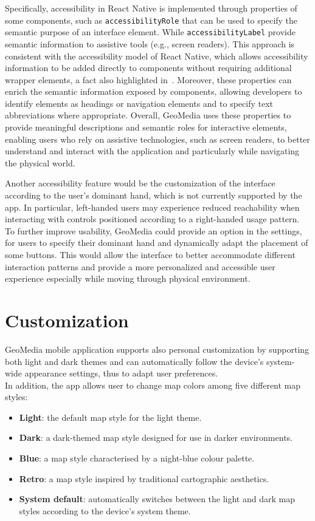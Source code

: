 Specifically, accessibility in React Native is implemented through properties of some components, such as \texttt{accessibilityRole} that can be used to specify the semantic purpose of an interface element. While \texttt{accessibilityLabel} provide semantic information to assistive tools (e.g., screen readers). This approach is consistent with the accessibility model of React Native, which allows accessibility information to be added directly to components without requiring additional wrapper elements, a fact also highlighted in~\cite{article:perinello2024}. Moreover, these properties can enrich the semantic information exposed by components, allowing developers to identify elements as headings or navigation elements and to specify text abbreviations where appropriate. Overall, GeoMedia uses these properties to provide meaningful descriptions and semantic roles for interactive elements, enabling users who rely on assistive technologies, such as screen readers, to better understand and interact with the application and particularly while navigating the physical world.


Another accessibility feature would be the customization of the interface according to the user's dominant hand, which is not currently supported by the app. In particular, left-handed users may experience reduced reachability when interacting with controls positioned according to a right-handed usage pattern. To further improve usability, GeoMedia could provide an option in the settings, for users to specify their dominant hand and dynamically adapt the placement of some buttons. This would allow the interface to better accommodate different interaction patterns and provide a more personalized and accessible user experience especially while moving through physical environment.

\section{Customization}

GeoMedia mobile application supports also personal customization by supporting both light and dark themes and can automatically follow the device's system-wide appearance settings, thus to adapt user preferences. \\
In addition, the app allows user to change map colors among five different map styles:

\begin{itemize}
\item \textbf{Light}: the default map style for the light theme.
\item \textbf{Dark}: a dark-themed map style designed for use in darker environments.
\item \textbf{Blue}: a map style characterised by a night-blue colour palette.
\item \textbf{Retro}: a map style inspired by traditional cartographic aesthetics.
\item \textbf{System default}: automatically switches between the light and dark map styles according to the device's system theme.
\end{itemize}

